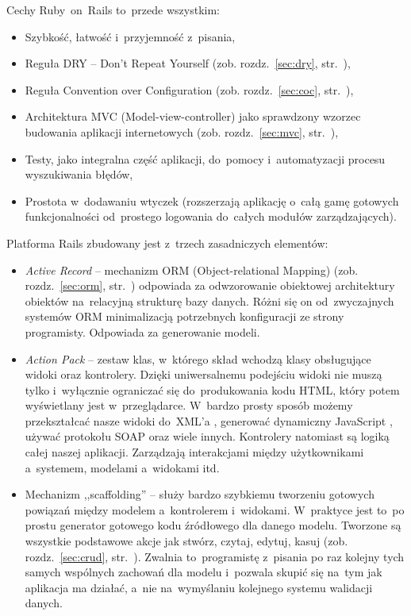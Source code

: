 \documentclass[a4paper,12pt,oneside]{report}
\begin{document}
Cechy Ruby~on~Rails to~przede wszystkim:
\begin{itemize}
  \item Szybkość, łatwość i~przyjemność z~pisania,
  \item Reguła DRY -- Don't Repeat Yourself (zob. rozdz.~\ref{sec:dry}, str.~\pageref{sec:dry}),
  \item Reguła Convention over Configuration (zob. rozdz.~\ref{sec:coc}, str.~\pageref{sec:coc}),
  \item Architektura MVC (Model-view-controller) jako sprawdzony wzorzec budowania aplikacji internetowych (zob. rozdz.~\ref{sec:mvc}, str.~\pageref{sec:mvc}),
  \item Testy, jako integralna część aplikacji, do~pomocy i~automatyzacji procesu wyszukiwania błędów,
  \item Prostota w~dodawaniu wtyczek (rozszerzają aplikację o~całą gamę gotowych funkcjonalności od~prostego logowania do~całych modułów zarządzających).
\end{itemize}

Platforma Rails zbudowany jest z~trzech zasadniczych elementów:

\begin{itemize}
\item \emph{Active Record} -- mechanizm ORM (Object-relational Mapping) (zob. rozdz.~\ref{sec:orm}, str.~\pageref{sec:orm}) odpowiada za odwzorowanie obiektowej architektury obiektów na~relacyjną strukturę bazy danych. Różni się on od~zwyczajnych systemów ORM minimalizacją potrzebnych konfiguracji ze strony programisty. Odpowiada za generowanie modeli.
\item \emph{Action Pack} -- zestaw klas, w~którego skład wchodzą klasy obsługujące widoki oraz kontrolery. Dzięki uniwersalnemu podejściu widoki nie muszą tylko i~wyłącznie ograniczać się do~produkowania kodu HTML, który potem wyświetlany jest w~przeglądarce. W~bardzo prosty sposób możemy przekształcać nasze widoki do~XML’a , generować dynamiczny JavaScript , używać protokołu SOAP oraz wiele innych. Kontrolery natomiast są logiką całej naszej aplikacji. Zarządzają interakcjami między użytkownikami a~systemem, modelami a~widokami itd.
\item Mechanizm ,,scaffolding'' -- służy bardzo szybkiemu tworzeniu gotowych powiązań między modelem a~kontrolerem i~widokami. W~praktyce jest to~po prostu generator gotowego kodu źródłowego dla danego modelu. Tworzone są wszystkie podstawowe akcje jak stwórz, czytaj, edytuj, kasuj (zob. rozdz.~\ref{sec:crud}, str.~\pageref{sec:crud}). Zwalnia to~programistę z~pisania po raz kolejny tych samych wspólnych zachowań dla modelu i~pozwala skupić się na~tym jak aplikacja ma działać, a~nie na~wymyślaniu kolejnego systemu walidacji danych.
\end{itemize}
\end{document}

